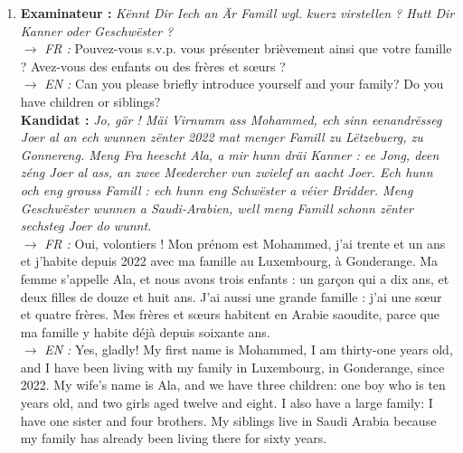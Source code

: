 \begin{enumerate}
    \item \textbf{Examinateur :} \textit{Kënnt Dir Iech an Är Famill wgl. kuerz virstellen ? Hutt Dir Kanner oder Geschwëster ?} \\
    $\rightarrow$ \textit{FR :} Pouvez-vous s.v.p. vous présenter brièvement ainsi que votre famille ? Avez-vous des enfants ou des frères et sœurs ? \\
    $\rightarrow$ \textit{EN :} Can you please briefly introduce yourself and your family? Do you have children or siblings? \\
    \textbf{Kandidat :} \textit{Jo, gär ! Mäi Virnumm ass Mohammed, ech sinn eenandrësseg Joer al an ech wunnen zënter 2022 mat menger Famill zu Lëtzebuerg, zu Gonnereng. Meng Fra heescht Ala, a mir hunn dräi Kanner : ee Jong, deen zéng Joer al ass, an zwee Meedercher vun zwielef an aacht Joer. Ech hunn och eng grouss Famill : ech hunn eng Schwëster a véier Bridder. Meng Geschwëster wunnen a Saudi-Arabien, well meng Famill schonn zënter sechsteg Joer do wunnt.} \\
    $\rightarrow$ \textit{FR :} Oui, volontiers ! Mon prénom est Mohammed, j'ai trente et un ans et j'habite depuis 2022 avec ma famille au Luxembourg, à Gonderange. Ma femme s'appelle Ala, et nous avons trois enfants : un garçon qui a dix ans, et deux filles de douze et huit ans. J'ai aussi une grande famille : j'ai une sœur et quatre frères. Mes frères et sœurs habitent en Arabie saoudite, parce que ma famille y habite déjà depuis soixante ans. \\
    $\rightarrow$ \textit{EN :} Yes, gladly! My first name is Mohammed, I am thirty-one years old, and I have been living with my family in Luxembourg, in Gonderange, since 2022. My wife's name is Ala, and we have three children: one boy who is ten years old, and two girls aged twelve and eight. I also have a large family: I have one sister and four brothers. My siblings live in Saudi Arabia because my family has already been living there for sixty years.

    \vspace{0.4em}


\end{enumerate}
